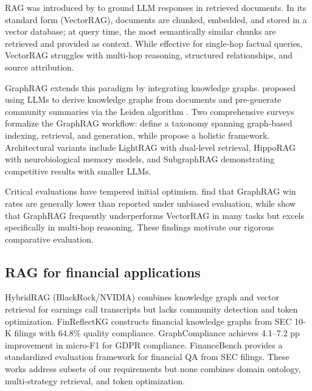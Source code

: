 \documentclass[review]{elsarticle}
\begin{document}
RAG was introduced by \citet{lewis2020rag} to ground LLM responses in retrieved documents. In its standard form (VectorRAG), documents are chunked, embedded, and stored in a vector database; at query time, the most semantically similar chunks are retrieved and provided as context. While effective for single-hop factual queries, VectorRAG struggles with multi-hop reasoning, structured relationships, and source attribution.

GraphRAG extends this paradigm by integrating knowledge graphs. \citet{edge2024graphrag} proposed using LLMs to derive knowledge graphs from documents and pre-generate community summaries via the Leiden algorithm \citep{traag2019leiden}. Two comprehensive surveys formalize the GraphRAG workflow: \citet{peng2024graphrag} define a taxonomy spanning graph-based indexing, retrieval, and generation, while \citet{han2025graphragsurvey} propose a holistic framework. Architectural variants include LightRAG \citep{guo2024lightrag} with dual-level retrieval, HippoRAG \citep{gutierrez2024hipporag} with neurobiological memory models, and SubgraphRAG \citep{li2025subgraphrag} demonstrating competitive results with smaller LLMs.

Critical evaluations have tempered initial optimism. \citet{unbiased2025} find that GraphRAG win rates are generally lower than reported under unbiased evaluation, while \citet{whenusegraphs2025} show that GraphRAG frequently underperforms VectorRAG in many tasks but excels specifically in multi-hop reasoning. These findings motivate our rigorous comparative evaluation.

\subsection{RAG for financial applications}

HybridRAG \citep{sarmah2024hybridrag} (BlackRock/NVIDIA) combines knowledge graph and vector retrieval for earnings call transcripts but lacks community detection and token optimization. FinReflectKG \citep{arun2025finreflectkg} constructs financial knowledge graphs from SEC 10-K filings with 64.8\% quality compliance. GraphCompliance \citep{graphcompliance2025} achieves 4.1--7.2 pp improvement in micro-F1 for GDPR compliance. FinanceBench \citep{islam2023financebench} provides a standardized evaluation framework for financial QA from SEC filings. These works address subsets of our requirements but none combines domain ontology, multi-strategy retrieval, and token optimization.
\end{document}
